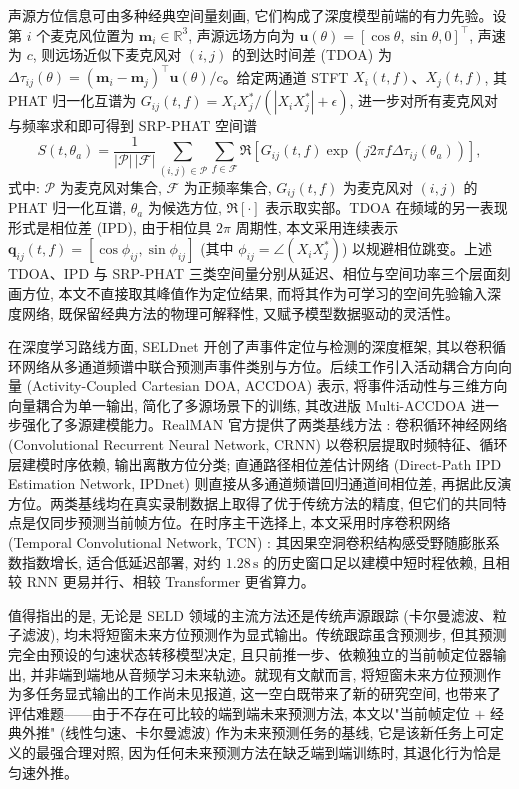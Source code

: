 \documentclass[lang=cn,a4paper,newtx]{elegantpaper}
\begin{document}
声源方位信息可由多种经典空间量刻画, 它们构成了深度模型前端的有力先验。设第 $i$ 个麦克风位置为 $\mathbf{m}_i\in\mathbb{R}^3$, 声源远场方向为 $\mathbf{u}(\theta)=[\cos\theta,\sin\theta,0]^\top$, 声速为 $c$, 则远场近似下麦克风对 $(i,j)$ 的到达时间差 (TDOA) 为 $\Delta\tau_{ij}(\theta)=(\mathbf{m}_i-\mathbf{m}_j)^\top \mathbf{u}(\theta)/c$。给定两通道 STFT $X_i(t,f)$、$X_j(t,f)$, 其 PHAT 归一化互谱为 $G_{ij}(t,f)={X_iX_j^*}/({|X_iX_j^*|+\epsilon})$, 进一步对所有麦克风对与频率求和即可得到 SRP-PHAT 空间谱
\begin{equation}
  S(t,\theta_a)
  =
  \frac{1}{|\mathcal{P}|\,|\mathcal{F}|}
  \sum_{(i,j)\in\mathcal{P}}
  \sum_{f\in\mathcal{F}}
  \Re\!\left[
    G_{ij}(t,f)
    \exp\!\left(j2\pi f\Delta\tau_{ij}(\theta_a)\right)
  \right],
  \label{eq:srp}
\end{equation}
式中: $\mathcal{P}$ 为麦克风对集合, $\mathcal{F}$ 为正频率集合, $G_{ij}(t,f)$ 为麦克风对 $(i,j)$ 的 PHAT 归一化互谱, $\theta_a$ 为候选方位, $\Re[\cdot]$ 表示取实部。TDOA 在频域的另一表现形式是相位差 (IPD), 由于相位具 $2\pi$ 周期性, 本文采用连续表示 $\mathbf{q}_{ij}(t,f)=[\cos\phi_{ij},\sin\phi_{ij}]$ (其中 $\phi_{ij}=\angle(X_iX_j^*)$) 以规避相位跳变。上述 TDOA、IPD 与 SRP-PHAT 三类空间量分别从延迟、相位与空间功率三个层面刻画方位, 本文不直接取其峰值作为定位结果, 而将其作为可学习的空间先验输入深度网络, 既保留经典方法的物理可解释性, 又赋予模型数据驱动的灵活性。

在深度学习路线方面, SELDnet \cite{adavanne2019seldnet} 开创了声事件定位与检测的深度框架, 其以卷积循环网络从多通道频谱中联合预测声事件类别与方位。后续工作引入活动耦合方向向量 (Activity-Coupled Cartesian DOA, ACCDOA) 表示, 将事件活动性与三维方向向量耦合为单一输出, 简化了多源场景下的训练, 其改进版 Multi-ACCDOA 进一步强化了多源建模能力。RealMAN 官方提供了两类基线方法 \cite{wang2024ipdnet}: 卷积循环神经网络 (Convolutional Recurrent Neural Network, CRNN) 以卷积层提取时频特征、循环层建模时序依赖, 输出离散方位分类; 直通路径相位差估计网络 (Direct-Path IPD Estimation Network, IPDnet) 则直接从多通道频谱回归通道间相位差, 再据此反演方位。两类基线均在真实录制数据上取得了优于传统方法的精度, 但它们的共同特点是仅同步预测当前帧方位。在时序主干选择上, 本文采用时序卷积网络 (Temporal Convolutional Network, TCN) \cite{bai2018tcn}: 其因果空洞卷积结构感受野随膨胀系数指数增长, 适合低延迟部署, 对约 $1.28\,\mathrm{s}$ 的历史窗口足以建模中短时程依赖, 且相较 RNN 更易并行、相较 Transformer 更省算力。

值得指出的是, 无论是 SELD 领域的主流方法还是传统声源跟踪 (卡尔曼滤波、粒子滤波), 均未将短窗未来方位预测作为显式输出。传统跟踪虽含预测步, 但其预测完全由预设的匀速状态转移模型决定, 且只前推一步、依赖独立的当前帧定位器输出, 并非端到端地从音频学习未来轨迹。就现有文献而言, 将短窗未来方位预测作为多任务显式输出的工作尚未见报道, 这一空白既带来了新的研究空间, 也带来了评估难题——由于不存在可比较的端到端未来预测方法, 本文以"当前帧定位 $+$ 经典外推" (线性匀速、卡尔曼滤波) 作为未来预测任务的基线, 它是该新任务上可定义的最强合理对照, 因为任何未来预测方法在缺乏端到端训练时, 其退化行为恰是匀速外推。
\end{document}
